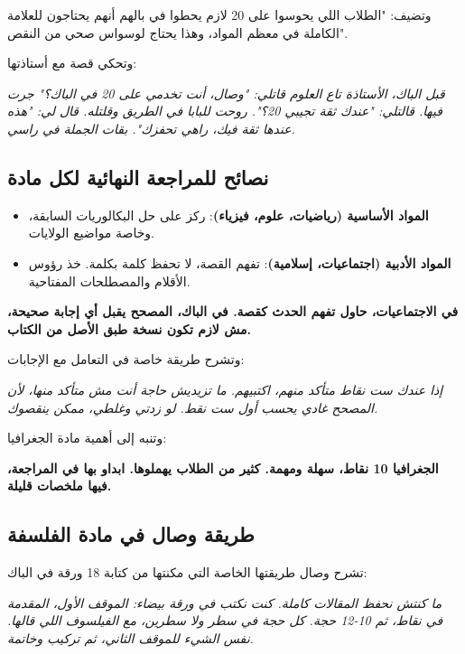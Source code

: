 \documentclass[12pt,a4paper]{book}
\newcommand{\quoteAr}[1]{%
	\begin{myquote}
		\itshape #1
	\end{myquote}
}
\newcommand{\importantAr}[1]{%
	\begin{important}
		\bfseries #1
	\end{important}
}
\begin{document}
	وتضيف: "الطلاب اللي يحوسوا على 20 لازم يحطوا في بالهم أنهم يحتاجون للعلامة الكاملة في معظم المواد، وهذا يحتاج لوسواس صحي من النقص".
	
	وتحكي قصة مع أستاذتها:
	
	\quoteAr{قبل الباك، الأستاذة تاع العلوم قاتلي: "وصال، أنت تخدمي على 20 في الباك؟" جرت فيها. قالتلي: "عندك ثقة تجيبي 20؟". روحت للبابا في الطريق وقلتله. قال لي: "هذه عندها ثقة فيك، راهي تحفزك". بقات الجملة في راسي.}
	
	\subsection{نصائح للمراجعة النهائية لكل مادة}
	\label{sec:random-tips22}
	
	\begin{itemize}
		\item \textbf{المواد الأساسية (رياضيات، علوم، فيزياء)}: ركز على حل البكالوريات السابقة، وخاصة مواضيع الولايات.
		\item \textbf{المواد الأدبية (اجتماعيات، إسلامية)}: تفهم القصة، لا تحفظ كلمة بكلمة. خذ رؤوس الأقلام والمصطلحات المفتاحية.
	\end{itemize}
	
	\importantAr{في الاجتماعيات، حاول تفهم الحدث كقصة. في الباك، المصحح يقبل أي إجابة صحيحة، مش لازم تكون نسخة طبق الأصل من الكتاب.}
	
	وتشرح طريقة خاصة في التعامل مع الإجابات:
	
	\quoteAr{إذا عندك ست نقاط متأكد منهم، اكتبيهم. ما تزيديش حاجة أنت مش متأكد منها، لأن المصحح غادي يحسب أول ست نقط. لو زدتي وغلطي، ممكن ينقصوك.}
	
	وتنبه إلى أهمية مادة الجغرافيا:
	
	\importantAr{الجغرافيا 10 نقاط، سهلة ومهمة. كثير من الطلاب يهملوها. ابداو بها في المراجعة، فيها ملخصات قليلة.}
	
	\subsection{طريقة وصال في مادة الفلسفة}
	
	تشرح وصال طريقتها الخاصة التي مكنتها من كتابة 18 ورقة في الباك:
	
	\quoteAr{ما كنتش نحفظ المقالات كاملة. كنت نكتب في ورقة بيضاء: الموقف الأول، المقدمة في نقاط، ثم 10-12 حجة. كل حجة في سطر ولا سطرين، مع الفيلسوف اللي قالها. نفس الشيء للموقف الثاني، ثم تركيب وخاتمة.}
	
\end{document}
